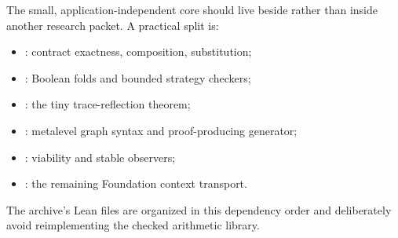 The small, application-independent core should live beside  rather than inside another research packet.  A practical split is:
\begin{itemize}
  \item {}: contract exactness, composition, substitution;
  \item {}: Boolean folds and bounded strategy checkers;
  \item {}: the tiny trace-reflection theorem;
  \item {}: metalevel graph syntax and proof-producing generator;
  \item {}: viability and stable observers;
  \item {}: the remaining Foundation context transport.
\end{itemize}
The archive's Lean files are organized in this dependency order and deliberately avoid reimplementing the checked arithmetic library.
